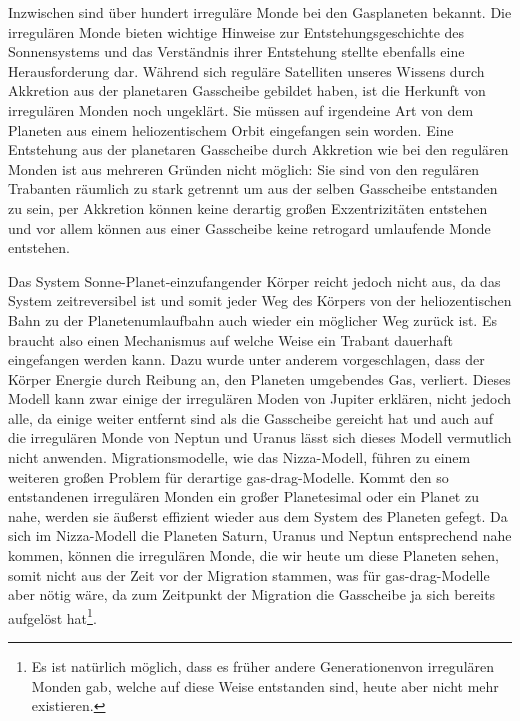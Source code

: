 \documentclass[12pt,a4paper,twoside]{article}
\renewcommand{\cite}{\citep}
\begin{document}
Inzwischen sind über hundert irreguläre Monde bei den Gasplaneten bekannt\cite{Nicholson2008}.
Die irregulären Monde bieten wichtige Hinweise zur Entstehungsgeschichte des Sonnensystems und das Verständnis ihrer Entstehung stellte ebenfalls eine Herausforderung dar.
Während sich reguläre Satelliten unseres Wissens durch Akkretion aus der planetaren Gasscheibe gebildet haben, ist die Herkunft von irregulären Monden noch ungeklärt.
Sie müssen auf irgendeine Art von dem Planeten aus einem heliozentischem Orbit eingefangen sein worden. Eine Entstehung aus der planetaren Gasscheibe durch Akkretion wie bei den regulären Monden ist aus mehreren Gründen nicht möglich:
Sie sind von den regulären Trabanten räumlich zu stark getrennt um aus der selben Gasscheibe entstanden zu sein, per Akkretion können keine derartig großen Exzentrizitäten entstehen und vor allem können aus einer Gasscheibe keine retrogard umlaufende Monde entstehen\cite{Nesvorny2007}.

Das System Sonne-Planet-einzufangender Körper reicht jedoch nicht aus, da das System zeitreversibel ist und somit jeder Weg des Körpers von der heliozentischen Bahn zu der Planetenumlaufbahn auch wieder ein möglicher Weg zurück ist\cite{Nesvorny2007}.
Es braucht also einen Mechanismus auf welche Weise ein Trabant dauerhaft eingefangen werden kann. Dazu wurde unter anderem vorgeschlagen, dass der Körper Energie durch Reibung an, den Planeten umgebendes Gas, verliert. %
Dieses Modell kann zwar einige der irregulären Moden von Jupiter erklären, nicht jedoch alle, da einige weiter entfernt sind als die Gasscheibe gereicht hat und auch auf die irregulären Monde von Neptun und Uranus lässt sich dieses Modell vermutlich nicht anwenden\cite{Nesvorny2007}. %
Migrationsmodelle, wie das Nizza-Modell, führen zu einem weiteren großen Problem für derartige \glqq gas-drag\grqq-Modelle. Kommt den so entstandenen irregulären Monden ein großer Planetesimal oder ein Planet zu nahe, werden sie äußerst effizient wieder aus dem System des Planeten gefegt\cite{Nesvorny2007}. Da sich im Nizza-Modell die Planeten Saturn, Uranus und Neptun entsprechend nahe kommen, können die irregulären Monde, die wir heute um diese Planeten sehen, somit nicht aus der Zeit vor der Migration stammen\cite{Tsiganis2005,Nesvorny2007}, was für \glqq gas-drag\grqq-Modelle aber nötig wäre, da zum Zeitpunkt der Migration die Gasscheibe ja sich bereits aufgelöst hat\footnote{Es ist natürlich möglich, dass es früher andere \glqq Generationen\grqq von irregulären Monden gab, welche auf diese Weise entstanden sind, heute aber nicht mehr existieren. }.
\end{document}
